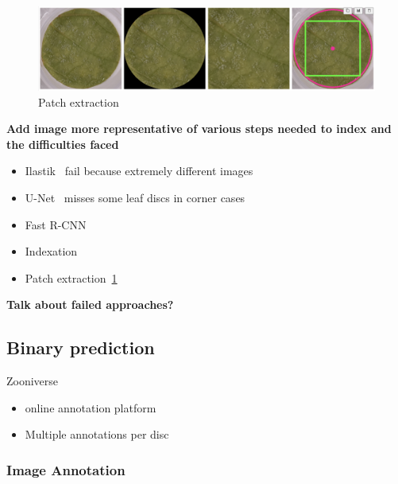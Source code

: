 \documentclass[english]{article}
\begin{document}
\begin{figure}
	\centering
	\includegraphics[width=0.8\linewidth]{ld_detector_brute_force.png}
	\caption{Patch extraction}\label{fig:patchextraction}
\end{figure}

\textbf{Add image more representative of various steps needed to index and the difficulties faced}

\begin{itemize}
	\item Ilastik~\parencite{bergIlastikInteractiveMachine2019} fail because extremely different images
	\item U-Net~\parencite{ronnebergerUNetConvolutionalNetworks2015} misses some leaf discs in corner cases
	\item Fast R-CNN~\parencite{girshickFastRCNN2015}
	\item Indexation
	\item Patch extraction~\ref{fig:patchextraction}
\end{itemize}

\textbf{Talk about failed approaches?}

\subsection{Binary prediction}
Zooniverse \parencite{zooniverse}
\begin{itemize}
	\item online annotation platform
	\item Multiple annotations per disc
\end{itemize}

\subsubsection{Image Annotation}
\end{document}
